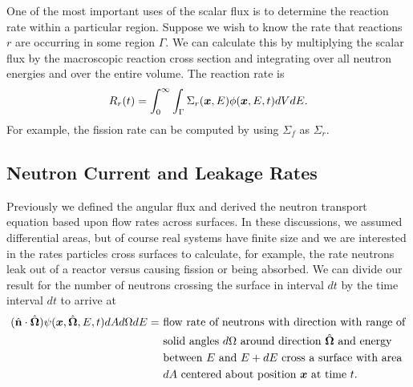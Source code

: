 One of the most important uses of the scalar flux is to determine the reaction rate within a particular region. Suppose we wish to know the rate that reactions $r$ are occurring in some region $\Gamma$. We can calculate this by multiplying the scalar flux by the macroscopic reaction cross section and integrating over all neutron energies and over the entire volume. The reaction rate is
\begin{align}
  R_r(t) = \int_0^\infty \int_\Gamma \Sigma_r(\bm{x},E) \phi(\bm{x},E,t) dV dE .
\end{align}
For example, the fission rate can be computed by using $\Sigma_f$ as $\Sigma_r$.

\subsection{Neutron Current and Leakage Rates}

Previously we defined the angular flux and derived the neutron transport equation based upon flow rates across surfaces. In these discussions, we assumed differential areas, but of course real systems have finite size and we are interested in the rates particles cross surfaces to calculate, for example, the rate neutrons leak out of a reactor versus causing fission or being absorbed. We can divide our result for the number of neutrons crossing the surface in interval $dt$ by the time interval $dt$ to arrive at
\begin{align}
  (\hat{\mathbf{n}} \cdot \hat{\mathbf{\Omega}})  \psi (\bm{x},\hat{\mathbf{\Omega}},E,t) dA d\Omega dE = 
  &\text{ flow rate of neutrons with direction with range of} \nonumber \\*
  &\text{ solid angles $d\Omega$ around direction $\hat{\mathbf{\Omega}}$ and energy } \nonumber \\*
  &\text{ between $E$ and $E + dE$ cross a surface with area } \nonumber \\*
  &\text{ $dA$ centered about position $\bm{x}$ at time $t$.} \nonumber
\end{align}

